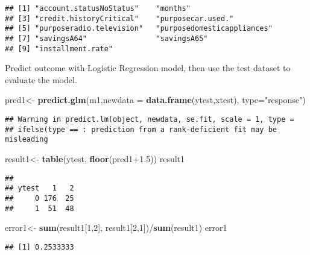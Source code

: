 \documentclass[]{article}
\newenvironment{Shaded}{\begin{snugshade}}{\end{snugshade}}
\newcommand{\KeywordTok}[1]{\textcolor[rgb]{0.13,0.29,0.53}{\textbf{{#1}}}}
\newcommand{\DataTypeTok}[1]{\textcolor[rgb]{0.13,0.29,0.53}{{#1}}}
\newcommand{\DecValTok}[1]{\textcolor[rgb]{0.00,0.00,0.81}{{#1}}}
\newcommand{\FloatTok}[1]{\textcolor[rgb]{0.00,0.00,0.81}{{#1}}}
\newcommand{\StringTok}[1]{\textcolor[rgb]{0.31,0.60,0.02}{{#1}}}
\newcommand{\NormalTok}[1]{{#1}}
\numberwithin{equation}{section}
\begin{document}
\begin{verbatim}
## [1] "account.statusNoStatus"    "months"                   
## [3] "credit.historyCritical"    "purposecar.used."         
## [5] "purposeradio.television"   "purposedomesticappliances"
## [7] "savingsA64"                "savingsA65"               
## [9] "installment.rate"
\end{verbatim}

Predict outcome with Logistic Regression model, then use the test
dataset to evaluate the model.

\begin{Shaded}
\begin{Highlighting}[]
\NormalTok{pred1<-}\StringTok{ }\KeywordTok{predict.glm}\NormalTok{(m1,}\DataTypeTok{newdata =} \KeywordTok{data.frame}\NormalTok{(ytest,xtest), }\DataTypeTok{type=}\StringTok{"response"}\NormalTok{)}
\end{Highlighting}
\end{Shaded}

\begin{verbatim}
## Warning in predict.lm(object, newdata, se.fit, scale = 1, type =
## ifelse(type == : prediction from a rank-deficient fit may be misleading
\end{verbatim}

\begin{Shaded}
\begin{Highlighting}[]
\NormalTok{result1<-}\StringTok{ }\KeywordTok{table}\NormalTok{(ytest, }\KeywordTok{floor}\NormalTok{(pred1}\FloatTok{+1.5}\NormalTok{))}
\NormalTok{result1}
\end{Highlighting}
\end{Shaded}

\begin{verbatim}
##      
## ytest   1   2
##     0 176  25
##     1  51  48
\end{verbatim}

\begin{Shaded}
\begin{Highlighting}[]
\NormalTok{error1<-}\StringTok{ }\KeywordTok{sum}\NormalTok{(result1[}\DecValTok{1}\NormalTok{,}\DecValTok{2}\NormalTok{], result1[}\DecValTok{2}\NormalTok{,}\DecValTok{1}\NormalTok{])/}\KeywordTok{sum}\NormalTok{(result1)}
\NormalTok{error1}
\end{Highlighting}
\end{Shaded}

\begin{verbatim}
## [1] 0.2533333
\end{verbatim}
\end{document}
